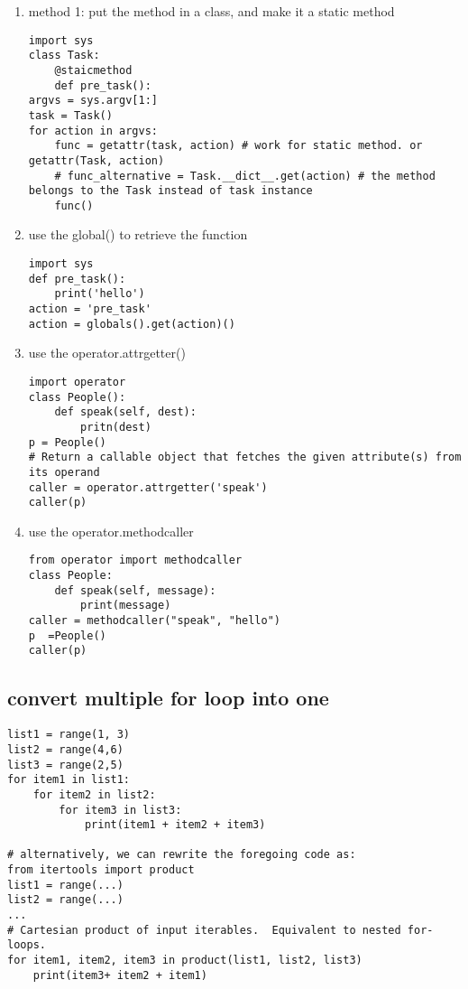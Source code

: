 \documentclass[11pt]{article}
\begin{document}
\begin{enumerate}
\item method 1: put the method in a class, and make it a static method
\label{sec:orgd8c550c}
\begin{verbatim}
import sys
class Task:
    @staicmethod
    def pre_task():
argvs = sys.argv[1:]
task = Task()
for action in argvs:
    func = getattr(task, action) # work for static method. or getattr(Task, action)
    # func_alternative = Task.__dict__.get(action) # the method belongs to the Task instead of task instance
    func()
\end{verbatim}

\item use the global() to retrieve the function
\label{sec:orge69c32b}
\begin{verbatim}
import sys
def pre_task():
    print('hello')
action = 'pre_task'
action = globals().get(action)()
\end{verbatim}

\item use the operator.attrgetter()
\label{sec:org2c93438}
\begin{verbatim}
import operator
class People():
    def speak(self, dest):
        pritn(dest)
p = People()
# Return a callable object that fetches the given attribute(s) from its operand
caller = operator.attrgetter('speak')
caller(p)
\end{verbatim}


\item use the operator.methodcaller
\label{sec:org54ff686}
\begin{verbatim}
from operator import methodcaller
class People:
    def speak(self, message):
        print(message)
caller = methodcaller("speak", "hello")
p  =People()
caller(p)

\end{verbatim}
\end{enumerate}


\subsection{convert multiple for loop into one}
\label{sec:org25d6553}
\begin{verbatim}
list1 = range(1, 3)
list2 = range(4,6)
list3 = range(2,5)
for item1 in list1:
    for item2 in list2:
        for item3 in list3:
            print(item1 + item2 + item3)

# alternatively, we can rewrite the foregoing code as:
from itertools import product
list1 = range(...)
list2 = range(...)
...
# Cartesian product of input iterables.  Equivalent to nested for-loops.
for item1, item2, item3 in product(list1, list2, list3)
    print(item3+ item2 + item1)
\end{verbatim}
\end{document}
